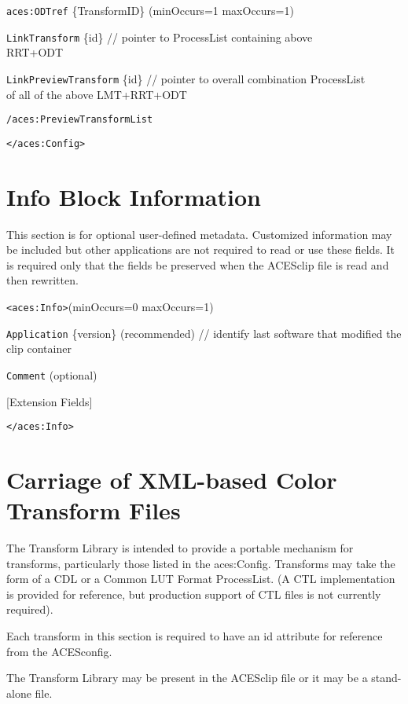 	\tabto{4em}\texttt{aces:ODTref} \{TransformID\} \tabto{3in}(minOccurs=1 maxOccurs=1)\par
	\tabto{6em}\texttt{LinkTransform} \{id\} \tabto{3.5in}// pointer to ProcessList containing above \\\tabto{3.6in}RRT+ODT\par
	\tabto{4em}\texttt{LinkPreviewTransform} \{id\} \tabto{3.5in}// pointer to overall combination ProcessList \\\tabto{3.6in}of all of the above LMT+RRT+ODT\par
	\tabto{2em}\texttt{/aces:PreviewTransformList} \par

\texttt{</aces:Config>}

\section{Info Block Information}
This section is for optional user-defined metadata.  Customized information may be included but other applications are not required to read or use these fields. It is required only that the fields be preserved when the ACESclip file is read and then rewritten. 

\texttt{<aces:Info>}\tabto{1.5in}(minOccurs=0 maxOccurs=1)

	\tabto{4em}\texttt{Application} \{version\} \tabto{2.25in}(recommended) \tabto{3.25in}// identify last software that modified the \\\tabto{3.35in}clip container\par
	\tabto{4em}\texttt{Comment} \tabto{2.25in}(optional) \par
	\tabto{4em}[Extension Fields]
	
\texttt{</aces:Info>}

\section{Carriage of XML-based Color Transform Files}
The Transform Library is intended to provide a portable mechanism for transforms, particularly those listed in the aces:Config.  Transforms may take the form of a CDL or a Common LUT Format ProcessList. (A CTL implementation is provided for reference, but production support of CTL files is not currently required).

Each transform in this section is required to have an {id} attribute for reference from the ACESconfig.

The Transform Library may be present in the ACESclip file or it may be a stand-alone file.

